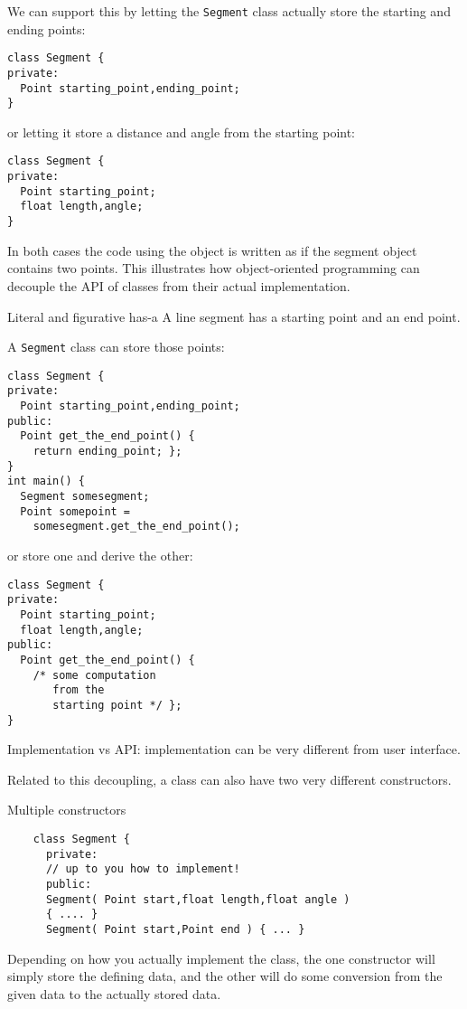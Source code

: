 We can support this by letting the \lstinline{Segment} class
actually store the starting and ending points:
\begin{lstlisting}
class Segment {
private:
  Point starting_point,ending_point;
}
\end{lstlisting}
or letting it store a distance and angle from the starting point:
\begin{lstlisting}
class Segment {
private:
  Point starting_point;
  float length,angle;
}
\end{lstlisting}
In both cases the code using the object is written as if the segment
object contains two points.
This illustrates how object-oriented programming can decouple the
\ac{API} of classes from their actual implementation.

\begin{slide}{Literal and figurative has-a}
  \label{sl:obj-hasa-ish}
\small
  A line segment has a starting point and an end point.
  \lstset{style=snippetcode}
\begin{multicols}{2}
  A \lstinline{Segment}
  class can store those points:
\begin{lstlisting}
class Segment {
private:
  Point starting_point,ending_point;
public:
  Point get_the_end_point() {
    return ending_point; };
}
int main() {
  Segment somesegment;
  Point somepoint =
    somesegment.get_the_end_point();
\end{lstlisting}
\columnbreak
or store one and derive the other:
\begin{lstlisting}
class Segment {
private:
  Point starting_point;
  float length,angle;
public:
  Point get_the_end_point() {
    /* some computation
       from the
       starting point */ };
}
\end{lstlisting}
\vfill\hbox{}
\end{multicols}
Implementation vs API: implementation can be very different from user interface.
\end{slide}

Related to this decoupling, a class can also have two very different constructors.
\begin{block}{Multiple constructors}
  \label{sl:segment-constructors}
  \begin{lstlisting}
    class Segment {
      private:
      // up to you how to implement!
      public:
      Segment( Point start,float length,float angle )
      { .... }
      Segment( Point start,Point end ) { ... }
  \end{lstlisting}
  Depending on how you actually implement the class, the one constructor
  will simply store the defining data, and the other will do some
  conversion from the given data to the actually stored data.
\end{block}

